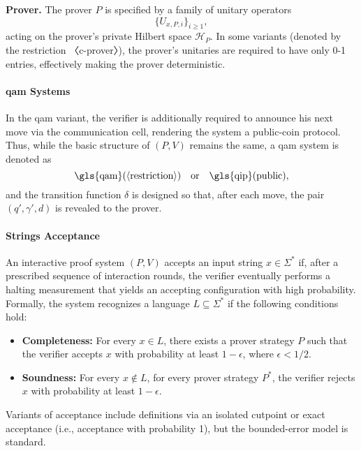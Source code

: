 \textbf{Prover.} The prover $P$ is specified by a family of unitary operators
\[
\{U_{x,P,i}\}_{i\ge1},
\]
acting on the prover's private Hilbert space $\mathit{\mathcal{H}}_P$. In some variants (denoted by the restriction 〈c-prover〉), the prover's unitaries are required to have only 0-1 entries, effectively making the prover deterministic.

\paragraph{\gls{qam} Systems} In the \gls{qam} variant, the verifier is additionally required to announce his next move via the communication cell, rendering the system a public-coin protocol. Thus, while the basic structure of $(P,V)$ remains the same, a \gls{qam} system is denoted as
\[
\text{\gls{qam}}(\langle\text{restriction}\rangle) \quad \text{or} \quad \text{\gls{qip}}(\text{public}),
\]
and the transition function $\delta$ is designed so that, after each move, the pair $(q',\gamma',d)$ is revealed to the prover.

\paragraph{Strings Acceptance}
An interactive proof system $(P,V)$ accepts an input string $x\in\Sigma^*$ if, after a prescribed sequence of interaction rounds, the verifier eventually performs a halting measurement that yields an accepting configuration with high probability. Formally, the system recognizes a language $L\subseteq\Sigma^*$ if the following conditions hold:
\begin{itemize}
  \item \textbf{Completeness:} For every $x\in L$, there exists a prover strategy $P$ such that the verifier accepts $x$ with probability at least $1-\epsilon$, where $\epsilon<1/2$.
  \item \textbf{Soundness:} For every $x\notin L$, for every prover strategy $P^*$, the verifier rejects $x$ with probability at least $1-\epsilon$.
\end{itemize}
Variants of acceptance include definitions via an isolated cutpoint or exact acceptance (i.e., acceptance with probability 1), but the bounded-error model is standard.

